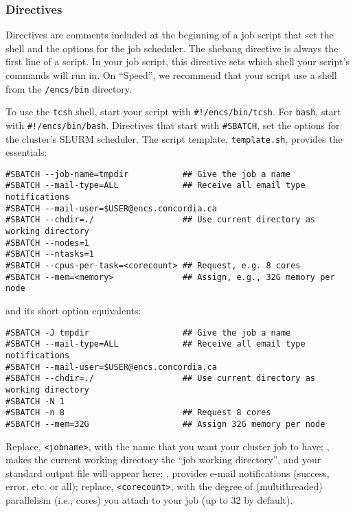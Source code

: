 \subsubsection{Directives}
\label{sect:directives}

Directives are comments included at the beginning of a job script that set the shell 
and the options for the job scheduler. 
%
The shebang directive is always the first line of a script. In your job script, 
this directive sets which shell your script's commands will run in. On ``Speed'', 
we recommend that your script use a shell from the \texttt{/encs/bin} directory. 

To use the \texttt{tcsh} shell, start your script with \verb|#!/encs/bin/tcsh|.
%
For \texttt{bash}, start with \verb|#!/encs/bin/bash|.
%
Directives that start with \verb|#SBATCH|, set the options for the cluster's 
SLURM scheduler. The script template, \texttt{template.sh}, 
provides the essentials:

\begin{verbatim}
#SBATCH --job-name=tmpdir           ## Give the job a name
#SBATCH --mail-type=ALL             ## Receive all email type notifications
#SBATCH --mail-user=$USER@encs.concordia.ca
#SBATCH --chdir=./                  ## Use current directory as working directory
#SBATCH --nodes=1
#SBATCH --ntasks=1
#SBATCH --cpus-per-task=<corecount> ## Request, e.g. 8 cores
#SBATCH --mem=<memory>              ## Assign, e.g., 32G memory per node 
\end{verbatim}

and its short option equivalents:

\begin{verbatim}
#SBATCH -J tmpdir                   ## Give the job a name
#SBATCH --mail-type=ALL             ## Receive all email type notifications
#SBATCH --mail-user=$USER@encs.concordia.ca
#SBATCH --chdir=./                  ## Use current directory as working directory
#SBATCH -N 1
#SBATCH -n 8                        ## Request 8 cores
#SBATCH --mem=32G                   ## Assign 32G memory per node 
\end{verbatim}

Replace, \verb+<jobname>+, with the name that you want your cluster job to have;
, makes the current working directory the ``job working directory'',
and your standard output file will appear here; , provides e-mail
notifications (success, error, etc. or all); replace, \verb+<corecount>+, with the degree of
(multithreaded) parallelism (i.e., cores) you attach to your job (up to 32 by default).

